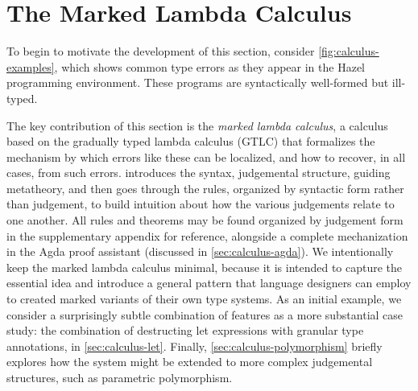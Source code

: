 \section{The Marked Lambda Calculus}
\label{sec:calculus}

To begin to motivate the development of this section, consider \cref{fig:calculus-examples}, which
shows common type errors as they appear in the Hazel programming environment. These programs are
syntactically well-formed but ill-typed.




The key contribution of this section is the \emph{marked lambda calculus}, a calculus based on the
gradually typed lambda calculus (GTLC) that formalizes the mechanism by which errors like these can
be localized, and how to recover, in all cases, from such errors. 
 introduces the syntax, judgemental structure, guiding metatheory, and
then goes through the rules, organized by syntactic form rather than judgement, to build intuition
about how the various judgements relate to one another.
All rules and theorems may be found organized by judgement form in the supplementary appendix for
reference, alongside a complete mechanization in the Agda proof assistant \cite{norell:thesis}
(discussed in \cref{sec:calculus-agda}).
We intentionally keep the marked lambda calculus minimal, because it is intended to capture the
essential idea and introduce a general pattern that language designers can employ to created marked
variants of their own type systems.
As an initial example, we consider a surprisingly subtle combination of features as a more
substantial case study: the combination of destructing let expressions with granular type
annotations, in \cref{sec:calculus-let}.
Finally, \cref{sec:calculus-polymorphism} briefly explores how the system might be extended to more
complex judgemental structures, such as parametric polymorphism.

